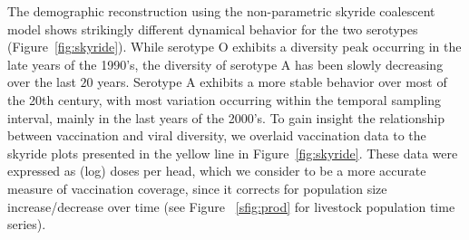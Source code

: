 \documentclass[10pt]{article}
\begin{document}
The demographic reconstruction using the non-parametric skyride coalescent model shows strikingly different dynamical behavior for the two serotypes (Figure~\ref{fig:skyride}).
While serotype O exhibits a diversity peak occurring in the late years of the 1990's, the diversity of serotype A has been slowly decreasing over the last $20$ years.
Serotype A exhibits a more stable behavior over most of the 20th century, with most variation occurring within the temporal sampling interval, mainly in the last years of the 2000's.
To gain insight the relationship between vaccination and viral diversity, we overlaid vaccination data to the skyride plots presented in the yellow line in Figure~\ref{fig:skyride}.
These data were expressed as (log) doses per head, which we consider to be a more accurate measure of vaccination coverage, since it corrects for population size increase/decrease over time (see Figure ~\ref{sfig:prod} for livestock population time series). 
\end{document}
